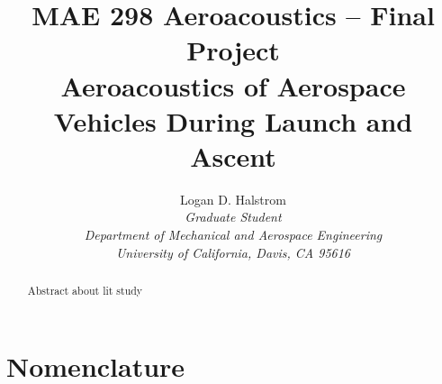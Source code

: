 \documentclass[]{aiaa-tc}%
\title{MAE 298 Aeroacoustics -- Final Project \\ Aeroacoustics of Aerospace Vehicles During Launch and Ascent}
\author{
  Logan D. Halstrom \\
  {\normalsize\itshape Graduate Student} \\
  {\normalsize\itshape Department of Mechanical and Aerospace Engineering} \\
  {\normalsize\itshape University of California, Davis, CA 95616}
       }
\begin{document}
\maketitle

\begin{abstract}

Abstract about lit study

\end{abstract}

\section*{Nomenclature}

\begin{multicols}{2}


\end{multicols}
\end{document}
